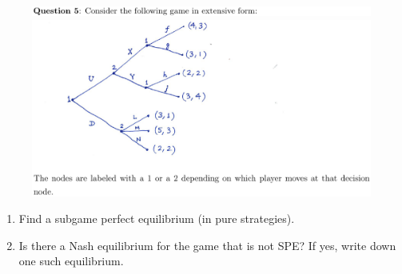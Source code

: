 \documentclass[12pt]{article}
\begin{document}
\pagebreak
\begin{figure}[h!]
\includegraphics[width=\linewidth]{./assets/201806021728.png}
\includegraphics[width=\linewidth]{./assets/201806021729.png}
\end{figure}
\begin{enumerate}[label=(\alph*)]
\item Find a subgame perfect equilibrium (in pure strategies).
\item Is there a Nash equilibrium for the game that is not SPE? If yes, write down one such equilibrium.
\end{enumerate}
\end{document}
